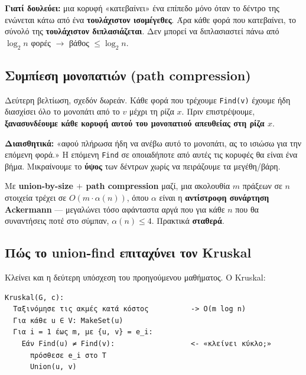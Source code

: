 \documentclass[11pt,a4paper]{article}
\begin{document}
\begin{intuition}
\textbf{Γιατί δουλεύει:} μια κορυφή «κατεβαίνει» ένα επίπεδο μόνο όταν το δέντρο
της ενώνεται κάτω από ένα \textbf{τουλάχιστον ισομέγεθες}. Άρα κάθε φορά που
κατεβαίνει, το σύνολό της \textbf{τουλάχιστον διπλασιάζεται}. Δεν μπορεί να
διπλασιαστεί πάνω από $\log_2 n$ φορές $\to$ βάθος $\le \log_2 n$.
\end{intuition}

\subsection{Συμπίεση μονοπατιών (path compression)}

Δεύτερη βελτίωση, σχεδόν δωρεάν. Κάθε φορά που τρέχουμε \texttt{Find(v)} έχουμε
ήδη διασχίσει όλο το μονοπάτι από το $v$ μέχρι τη ρίζα $x$. Πριν επιστρέψουμε,
\textbf{ξανασυνδέουμε κάθε κορυφή αυτού του μονοπατιού απευθείας στη ρίζα $x$}.

\begin{intuition}
\textbf{Διαισθητικά:} «αφού πλήρωσα ήδη να ανέβω αυτό το μονοπάτι, ας το ισιώσω
για την επόμενη φορά.» Η επόμενη \texttt{Find} σε οποιαδήποτε από αυτές τις
κορυφές θα είναι ένα βήμα. Μικραίνουμε το \textbf{ύψος} των δέντρων χωρίς να
πειράζουμε τα μεγέθη/βάρη.
\end{intuition}

Με \textbf{union-by-size $+$ path compression} μαζί, μια ακολουθία $m$ πράξεων
σε $n$ στοιχεία τρέχει σε $O(m \cdot \alpha(n))$, όπου $\alpha$ είναι η
\textbf{αντίστροφη συνάρτηση Ackermann} --- μεγαλώνει τόσο αφάνταστα αργά που για
κάθε $n$ που θα συναντήσεις ποτέ στο σύμπαν, $\alpha(n) \le 4$. Πρακτικά
\textbf{σταθερά}.

\subsection{Πώς το union-find επιταχύνει τον Kruskal}

Κλείνει και η δεύτερη υπόσχεση του προηγούμενου μαθήματος. Ο Kruskal:

\begin{codebox}
\begin{verbatim}
Kruskal(G, c):
  Ταξινόμησε τις ακμές κατά κόστος          -> O(m log n)
  Για κάθε u ∈ V: MakeSet(u)
  Για i = 1 έως m, με {u, v} = e_i:
    Εάν Find(u) ≠ Find(v):                  <- «κλείνει κύκλο;»
      πρόσθεσε e_i στο T
      Union(u, v)
\end{verbatim}
\end{codebox}
\end{document}
